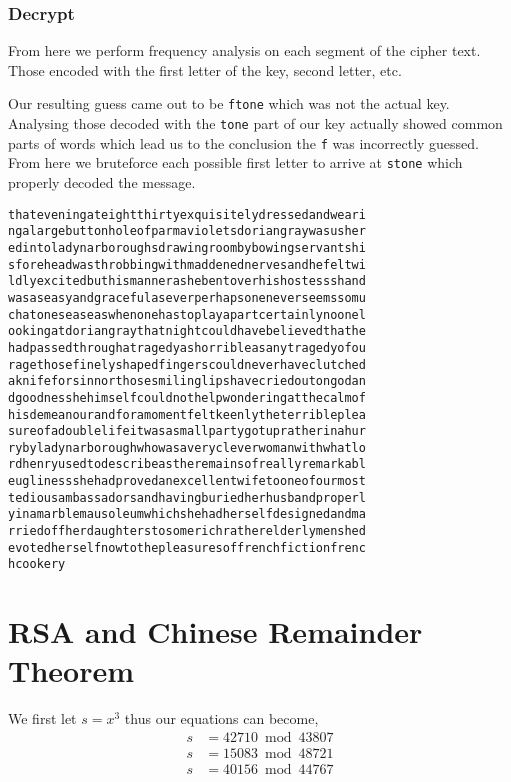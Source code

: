 \documentclass{article}
\begin{document}
\subsubsection{Decrypt}
From here we perform frequency analysis on each segment of the cipher text.
Those encoded with the first letter of the key, second letter, etc.


Our resulting guess came out to be \texttt{ftone} which was not the actual key.
Analysing those decoded with the \texttt{tone} part of our key actually showed
common parts of words which lead us to the conclusion the \texttt{f} was
incorrectly guessed. From here we bruteforce each possible first letter to
arrive at \texttt{stone} which properly decoded the message.
\begin{verbatim}
thateveningateightthirtyexquisitelydressedandweari
ngalargebuttonholeofparmavioletsdoriangraywasusher
edintoladynarboroughsdrawingroombybowingservantshi
sforeheadwasthrobbingwithmaddenednervesandhefeltwi
ldlyexcitedbuthismannerashebentoverhishostessshand
wasaseasyandgracefulaseverperhapsoneneverseemssomu
chatoneseaseaswhenonehastoplayapartcertainlynoonel
ookingatdoriangraythatnightcouldhavebelievedthathe
hadpassedthroughatragedyashorribleasanytragedyofou
ragethosefinelyshapedfingerscouldneverhaveclutched
aknifeforsinnorthosesmilinglipshavecriedoutongodan
dgoodnesshehimselfcouldnothelpwonderingatthecalmof
hisdemeanourandforamomentfeltkeenlytheterribleplea
sureofadoublelifeitwasasmallpartygotupratherinahur
rybyladynarboroughwhowasaverycleverwomanwithwhatlo
rdhenryusedtodescribeastheremainsofreallyremarkabl
euglinessshehadprovedanexcellentwifetooneofourmost
tediousambassadorsandhavingburiedherhusbandproperl
yinamarblemausoleumwhichshehadherselfdesignedandma
rriedoffherdaughterstosomerichratherelderlymenshed
evotedherselfnowtothepleasuresoffrenchfictionfrenc
hcookery
\end{verbatim}

\section{RSA and Chinese Remainder Theorem}
We first let $s = x^3$ thus our equations can become,
\begin{align*}
    s &= 42710 \bmod 43807 \\
    s &= 15083 \bmod 48721 \\
    s &= 40156 \bmod 44767 \\
\end{align*}
\end{document}
